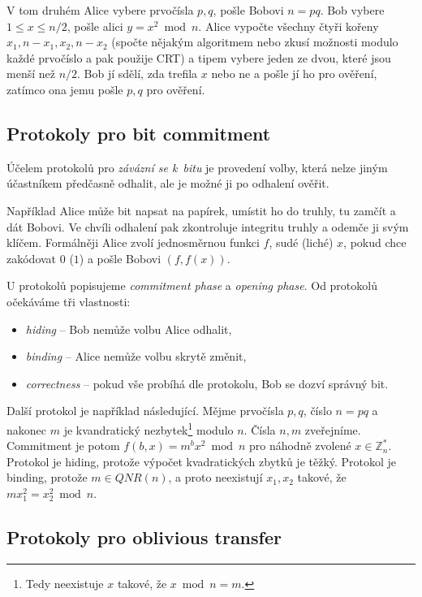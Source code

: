 V tom druhém Alice vybere prvočísla $p,q$, pošle Bobovi $n = pq$.
Bob vybere $1 \leq x \leq n/2$, pošle alici $y = x^2 \bmod n$.
Alice vypočte všechny čtyři kořeny $x_1, n-x_1, x_2, n - x_2$ (spočte
nějakým algoritmem nebo zkusí možnosti modulo každé prvočíslo a pak použije CRT)
a tipem vybere jeden ze dvou,
které jsou menší než $n/2$. Bob jí sdělí, zda trefila $x$ nebo ne a
pošle jí ho pro ověření, zatímco ona jemu pošle $p,q$ pro ověření.

\pagebreak

\subsection{Protokoly pro bit commitment}

Účelem protokolů pro {\em závázní se k~bitu} je provedení volby, která
nelze jiným účastníkem předčasně odhalit, ale je možné ji po odhalení
ověřit.

Například Alice může bit napsat na papírek, umístit ho do truhly, tu
zamčít a dát Bobovi. Ve chvíli odhalení pak zkontroluje integritu truhly
a odemče ji svým klíčem.  Formálněji Alice zvolí jednosměrnou funkci
$f$, sudé (liché) $x$, pokud chce zakódovat $0$ ($1$) a pošle Bobovi
$(f, f(x))$.

U protokolů popisujeme {\em commitment phase} a {\em opening phase}.
Od protokolů očekáváme tři vlastnosti:
\begin{itemize}
    \item {\em hiding} -- Bob nemůže volbu Alice odhalit,
    \item {\em binding} -- Alice nemůže volbu skrytě změnit,
    \item {\em correctness} -- pokud vše probíhá dle protokolu, Bob se dozví správný bit.
\end{itemize}

Další protokol je například následující. Mějme prvočísla $p,q$,
číslo $n = pq$ a nakonec $m$ je kvandratický nezbytek\footnote{Tedy
neexistuje $x$ takové, že $x \bmod n = m$.} modulo $n$. Čísla $n, m$
zveřejníme.  Commitment je potom $f(b, x) = m^b x^2 \bmod n$ pro náhodně
zvolené $x \in \mathbb{Z}^*_n$. Protokol je hiding, protože výpočet
kvadratických zbytků je těžký. Protokol je binding, protože $m \in
QNR(n)$, a proto neexistují $x_1, x_2$ takové, že
$m x_1^2 = x_2^2 \bmod n$.


\subsection{Protokoly pro oblivious transfer}

